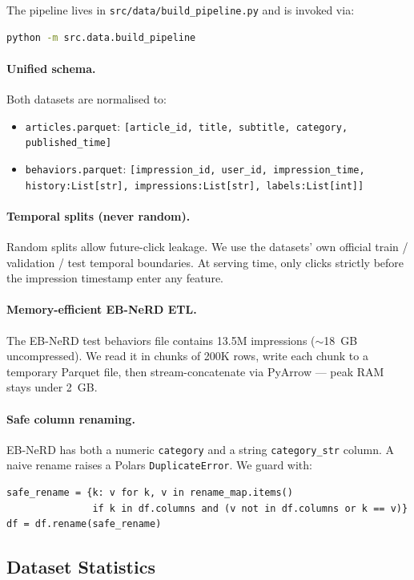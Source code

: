 \documentclass[11pt,a4paper]{article}
\begin{document}
The pipeline lives in \texttt{src/data/build\_pipeline.py} and is invoked via:
\begin{lstlisting}[language=bash]
python -m src.data.build_pipeline
\end{lstlisting}

\paragraph{Unified schema.} Both datasets are normalised to:
\begin{itemize}[noitemsep]
  \item \texttt{articles.parquet}: \texttt{[article\_id, title, subtitle, category, published\_time]}
  \item \texttt{behaviors.parquet}: \texttt{[impression\_id, user\_id, impression\_time, history:List[str], impressions:List[str], labels:List[int]]}
\end{itemize}

\paragraph{Temporal splits (never random).} Random splits allow future-click
leakage. We use the datasets' own official train / validation / test temporal
boundaries. At serving time, only clicks strictly before the impression timestamp
enter any feature.

\paragraph{Memory-efficient EB-NeRD ETL.} The EB-NeRD test behaviors file
contains 13.5M impressions ($\sim$18~GB uncompressed). We read it in chunks of
200K rows, write each chunk to a temporary Parquet file, then stream-concatenate
via PyArrow --- peak RAM stays under 2~GB.

\paragraph{Safe column renaming.} EB-NeRD has both a numeric \texttt{category}
and a string \texttt{category\_str} column. A naive rename raises a Polars
\texttt{DuplicateError}. We guard with:
\begin{lstlisting}
safe_rename = {k: v for k, v in rename_map.items()
               if k in df.columns and (v not in df.columns or k == v)}
df = df.rename(safe_rename)
\end{lstlisting}

\subsection{Dataset Statistics}
\end{document}
